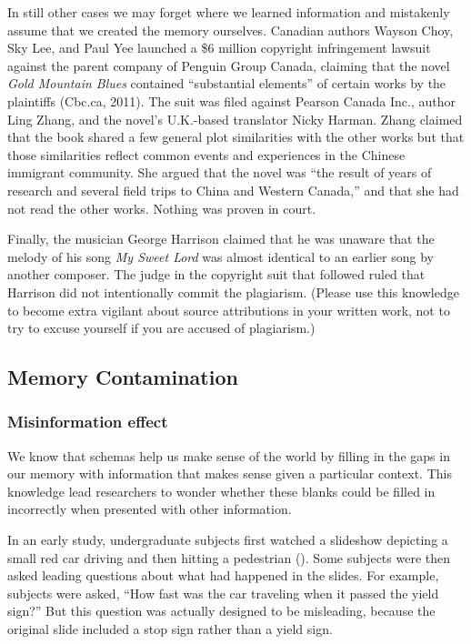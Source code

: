 \documentclass[
]{krantz}
\begin{document}
In still other cases we may forget where we learned information and mistakenly assume that we created the memory ourselves. Canadian authors Wayson Choy, Sky Lee, and Paul Yee launched a \$6 million copyright infringement lawsuit against the parent company of Penguin Group Canada, claiming that the novel \emph{Gold Mountain Blues} contained ``substantial elements'' of certain works by the plaintiffs (Cbc.ca, 2011). The suit was filed against Pearson Canada Inc., author Ling Zhang, and the novel's U.K.-based translator Nicky Harman. Zhang claimed that the book shared a few general plot similarities with the other works but that those similarities reflect common events and experiences in the Chinese immigrant community. She argued that the novel was ``the result of years of research and several field trips to China and Western Canada,'' and that she had not read the other works. Nothing was proven in court.

Finally, the musician George Harrison claimed that he was unaware that the melody of his song \emph{My Sweet Lord} was almost identical to an earlier song by another composer. The judge in the copyright suit that followed ruled that Harrison did not intentionally commit the plagiarism. (Please use this knowledge to become extra vigilant about source attributions in your written work, not to try to excuse yourself if you are accused of plagiarism.)

\subsection*{Memory Contamination}\label{memory-contamination}


\subsubsection*{Misinformation effect}\label{misinformation-effect}


We know that schemas help us make sense of the world by filling in the gaps in our memory with information that makes sense given a particular context. This knowledge lead researchers to wonder whether these blanks could be filled in incorrectly when presented with other information.

In an early study, undergraduate subjects first watched a slideshow depicting a small red car driving and then hitting a pedestrian (). Some subjects were then asked leading questions about what had happened in the slides. For example, subjects were asked, ``How fast was the car traveling when it passed the yield sign?'' But this question was actually designed to be misleading, because the original slide included a stop sign rather than a yield sign.
\end{document}
